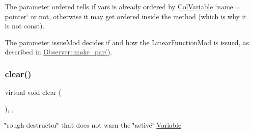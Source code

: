 The parameter ordered tells if vars is already ordered by \mbox{\hyperlink{class_s_m_spp__di__unipi__it_1_1_col_variable}{Col\+Variable}} \char`\"{}name = pointer\char`\"{} or not, otherwise it may get ordered inside the method (which is why it is not const).

The parameter issue\+Mod decides if and how the Linear\+Function\+Mod is issued, as described in \mbox{\hyperlink{class_s_m_spp__di__unipi__it_1_1_observer_a2d499ae38e5e95cf66cd71da32b0694a}{Observer\+::make\+\_\+par()}}. \mbox{\label{class_s_m_spp__di__unipi__it_1_1_linear_function_a9862fdd31593937c218bbda548c85fcc}} 
\subsubsection{\texorpdfstring{clear()}{clear()}}
{\footnotesize\ttfamily virtual void clear (\begin{DoxyParamCaption}\item[{void}]{ }\end{DoxyParamCaption})\hspace{0.3cm}{\ttfamily [inline]}, {\ttfamily [override]}, {\ttfamily [virtual]}}



\char`\"{}rough destructor\char`\"{} that does not warn the \char`\"{}active\char`\"{} \mbox{\hyperlink{class_s_m_spp__di__unipi__it_1_1_variable}{Variable}} 

